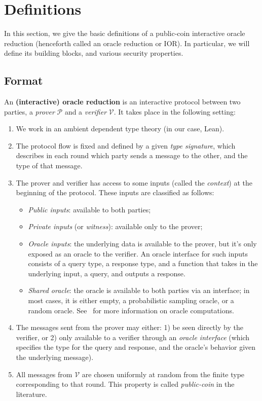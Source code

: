 \section{Definitions}

In this section, we give the basic definitions of a public-coin interactive oracle reduction
(henceforth called an oracle reduction or IOR). In particular, we will define its building blocks,
and various security properties.

\subsection{Format}

An \textbf{(interactive) oracle reduction} is an interactive protocol between two parties, a \emph{prover} $\mathcal{P}$
and a \emph{verifier} $\mathcal{V}$. It takes place in the following setting:
\begin{enumerate}
    \item We work in an ambient dependent type theory (in our case, Lean).
    \item The protocol flow is fixed and defined by a given \emph{type signature}, which
    describes in each round which party sends a message to the other, and the type of that message.
    \item The prover and verifier has access to some inputs (called the \emph{context}) at the beginning of the protocol. These inputs are classified as follows:
    \begin{itemize}
        \item \emph{Public inputs}: available to both parties;
        \item \emph{Private inputs} (or \emph{witness}): available only to the prover;
        \item \emph{Oracle inputs}: the underlying data is available to the prover, but it's only
        exposed as an oracle to the verifier. An oracle interface for such inputs consists of a query type, a response type, and a function that takes in the underlying input, a query, and outputs a response.
        \item \emph{Shared oracle}: the oracle is available to both parties via an interface; in most cases, it is either empty, a probabilistic sampling oracle, or a random oracle. See~ for more information on oracle computations.
    \end{itemize}
    \item The messages sent from the prover may either: 1) be seen directly by the verifier, or 2)
    only available to a verifier through an \emph{oracle interface} (which specifies the type for
    the query and response, and the oracle's behavior given the underlying message).
    \item All messages from $\mathcal{V}$ are chosen uniformly at random from the finite type corresponding to that round. This property is called \emph{public-coin} in the literature.
\end{enumerate}


